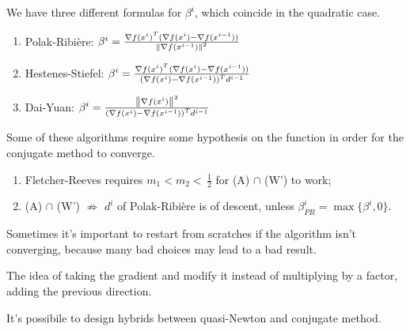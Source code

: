 \documentclass[ComputationalMathematics.tex]{subfiles}
\begin{document}

We have three different formulas for $\beta^i$, which coincide in the quadratic case.

\begin{enumerate}
  \item Polak-Ribi\`ere: $\beta^i = \frac{\nabla {f(x^i)}^{T} (\nabla f(x^i) - \nabla f(x^{i-1}))}{{\left\lVert\nabla f(x^{i-1})\right\rVert}^2}$  
  \item Hestenes-Stiefel: $\beta^i = \frac{{\nabla f(x^i)}^{T}(\nabla f(x^i) - \nabla f(x^{i-1}))}{{(\nabla f(x^i) - \nabla f(x^{i-1}))}^{T}d^{i-1}}$
    
  \item Dai-Yuan: $\beta^i = \frac{{\left\lVert\nabla f(x^i)\right\rVert}^2}{{(\nabla f(x^i) - \nabla f(x^{i-1}))}^{T} d^{i-1}}$
\end{enumerate}

Some of these algorithms require some hypothesis on the function in order for the conjugate method to converge.

\begin{enumerate}
  \item Fletcher-Reeves requires $m_1 < m_2 < \, \frac{1}{2}$ for (A) $\cap$ (W') to work;
  \item (A) $\cap$ (W') $\not\Longrightarrow$ $d^i$ of Polak-Ribière is of descent, unless $\beta^i_{PR} = \max \{\beta^i, 0\}$.
\end{enumerate}

Sometimes it's important to restart from scratches if the algorithm isn't converging, because many bad choices may lead to a bad result.

The idea of taking the gradient and modify it instead of multiplying by a factor, adding the previous direction.

It's possibile to design hybrids between quasi-Newton and conjugate method.
\end{document}
